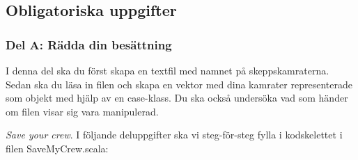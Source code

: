 



\subsection{Obligatoriska uppgifter}

\subsubsection{Del A: Rädda din besättning}

I denna del ska du först skapa en textfil med namnet på skeppskamraterna. Sedan ska du läsa in filen och skapa en vektor med dina kamrater representerade som objekt med hjälp av en case-klass. Du ska också undersöka vad som händer om filen visar sig vara manipulerad.

\Task \emph{Save your crew}. I följande deluppgifter ska vi steg-för-steg fylla i kodskelettet i filen SaveMyCrew.scala:


